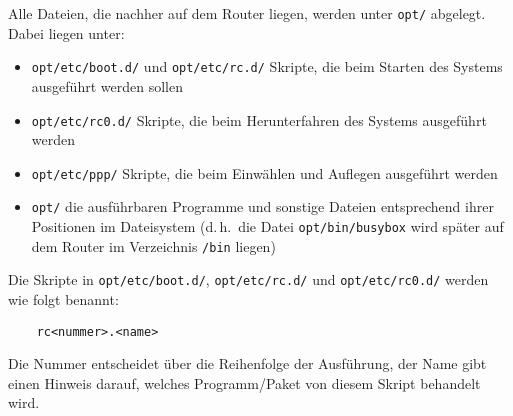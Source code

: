     Alle Dateien, die nachher auf dem Router liegen, werden unter \texttt{opt/}
    abgelegt. Dabei liegen unter:
    \begin{itemize}
    \item \texttt{opt/etc/boot.d/} und \texttt{opt/etc/rc.d/} Skripte, die beim Starten des
      Systems ausgeführt werden sollen
    \item \texttt{opt/etc/rc0.d/} Skripte, die beim Herunterfahren des Systems
      ausgeführt werden
    \item \texttt{opt/etc/ppp/} Skripte, die beim Einwählen und Auflegen
      ausgeführt werden
    \item \texttt{opt/} die ausführbaren Programme und sonstige Dateien
      entsprechend ihrer Positionen im Dateisystem (d.\,h.\ die Datei
      \texttt{opt/bin/busybox} wird später auf dem Router im Verzeichnis
      \texttt{/bin} liegen)
    \end{itemize}

    Die Skripte in \texttt{opt/etc/boot.d/}, \texttt{opt/etc/rc.d/} und
    \texttt{opt/etc/rc0.d/}
    werden wie folgt benannt:

    \begin{example}
    \begin{verbatim}
    rc<nummer>.<name>
    \end{verbatim}
    \end{example}

    Die Nummer entscheidet über die
    Reihenfolge der Ausführung, der Name gibt einen Hinweis darauf,
    welches Programm/Paket von diesem Skript behandelt wird.
